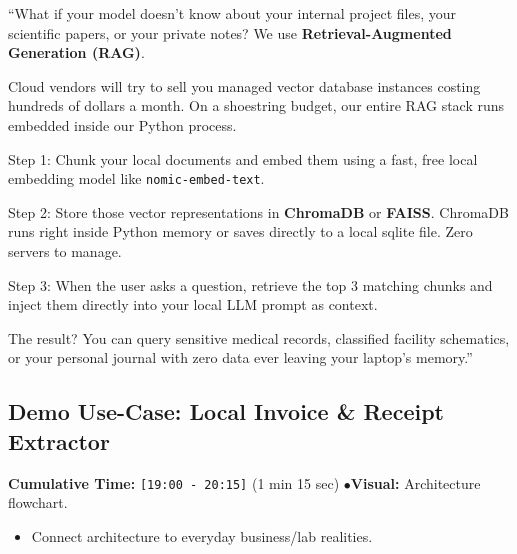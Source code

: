\documentclass[11pt,a4paper]{article}
\begin{document}
\begin{speechbox}
``What if your model doesn't know about your internal project files, your scientific papers, or your private notes? We use \textbf{Retrieval-Augmented Generation (RAG)}.

Cloud vendors will try to sell you managed vector database instances costing hundreds of dollars a month. On a shoestring budget, our entire RAG stack runs embedded inside our Python process.

Step 1: Chunk your local documents and embed them using a fast, free local embedding model like \texttt{nomic-embed-text}.

Step 2: Store those vector representations in \textbf{ChromaDB} or \textbf{FAISS}. ChromaDB runs right inside Python memory or saves directly to a local sqlite file. Zero servers to manage.

Step 3: When the user asks a question, retrieve the top 3 matching chunks and inject them directly into your local LLM prompt as context.

The result? You can query sensitive medical records, classified facility schematics, or your personal journal with zero data ever leaving your laptop's memory.''
\end{speechbox}

\subsection{Demo Use-Case: Local Invoice \& Receipt Extractor}
\begin{directionbox}
    \textbf{Cumulative Time:} \texttt{[19:00 - 20:15]} (1 min 15 sec) \quad$\bullet$\quad \textbf{Visual:} Architecture flowchart.
    \begin{itemize}
        \item Connect architecture to everyday business/lab realities.
    \end{itemize}
\end{directionbox}
\end{document}
